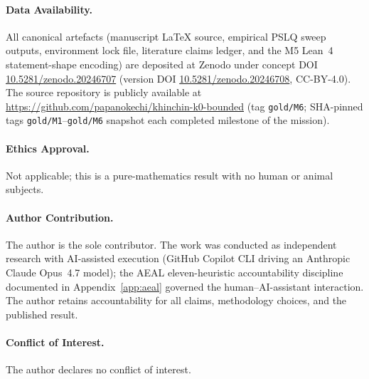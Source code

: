 \documentclass[11pt,a4paper]{article}
\begin{document}
\paragraph{Data Availability.} All canonical artefacts (manuscript
\LaTeX{} source, empirical PSLQ sweep outputs, environment lock file,
literature claims ledger, and the M5 Lean~4 statement-shape encoding)
are deposited at Zenodo under concept DOI
\href{https://doi.org/10.5281/zenodo.20246707}{10.5281/zenodo.20246707}
(version DOI \href{https://doi.org/10.5281/zenodo.20246708}{10.5281/zenodo.20246708},
CC-BY-4.0). The source repository is publicly available at
\url{https://github.com/papanokechi/khinchin-k0-bounded} (tag
\texttt{gold/M6}; SHA-pinned tags \texttt{gold/M1}--\texttt{gold/M6}
snapshot each completed milestone of the mission).

\paragraph{Ethics Approval.} Not applicable; this is a pure-mathematics
result with no human or animal subjects.

\paragraph{Author Contribution.} The author is the sole contributor. The
work was conducted as independent research with AI-assisted execution
(GitHub Copilot CLI driving an Anthropic Claude Opus~4.7 model); the
AEAL eleven-heuristic accountability discipline documented in
Appendix~\ref{app:aeal} governed the human--AI-assistant interaction.
The author retains accountability for all claims, methodology choices,
and the published result.

\paragraph{Conflict of Interest.} The author declares no conflict of
interest.



\end{document}

